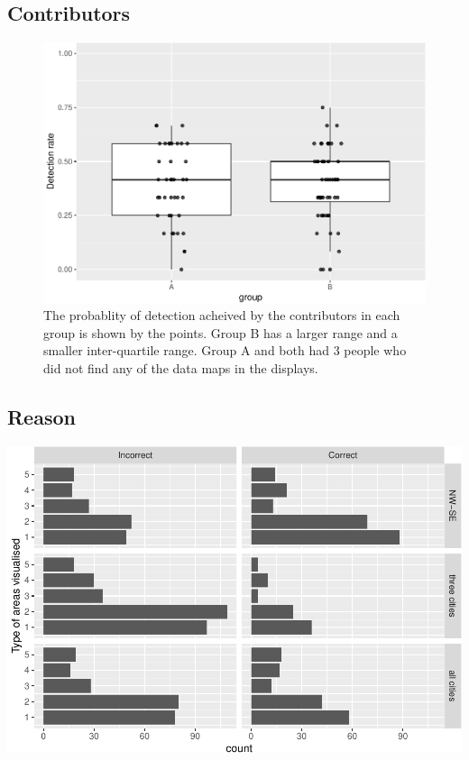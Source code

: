 \documentclass[conference,final,]{IEEEtran}
\makeatletter
\def\maxwidth{\ifdim\Gin@nat@width>\linewidth\linewidth
\else\Gin@nat@width\fi}
\let\Oldincludegraphics\includegraphics
\renewcommand{\includegraphics}[1]{\Oldincludegraphics[width=\maxwidth]{#1}}
\makeatother
\begin{document}
\hypertarget{contributors}{%
\subsection{Contributors}\label{contributors}}

\begin{figure}
\centering
\includegraphics{paper_files/figure-latex/unnamed-chunk-5-1.pdf}
\caption{The probablity of detection acheived by the contributors in
each group is shown by the points. Group B has a larger range and a
smaller inter-quartile range. Group A and both had 3 people who did not
find any of the data maps in the displays.}
\end{figure}

\hypertarget{reason-1}{%
\subsection{Reason}\label{reason-1}}

\includegraphics{paper_files/figure-latex/unnamed-chunk-6-1.pdf}
\end{document}
